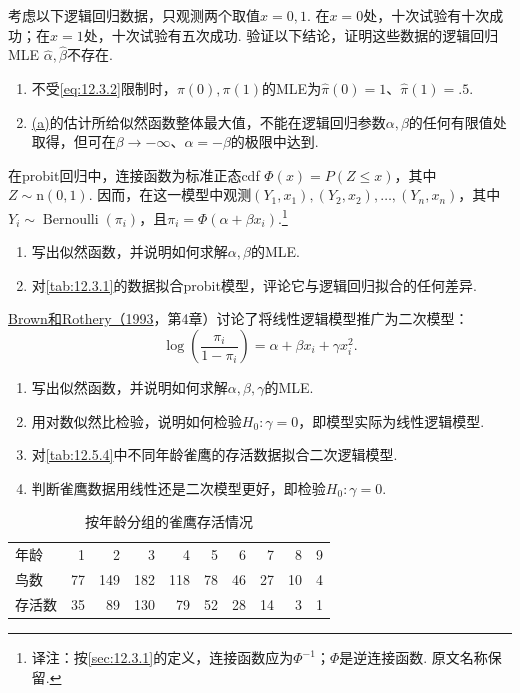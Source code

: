 \begin{exercise}\label{exercise:12.16}
考虑以下逻辑回归数据，只观测两个取值$x=0,1$. 在$x=0$处，十次试验有十次成功；在$x=1$处，十次试验有五次成功. 验证以下结论，证明这些数据的逻辑回归MLE $\hat\alpha,\hat\beta$不存在.
\begin{enumerate}[label=(\alph*)]
\item\label{item:12.16.a} 不受\eqref{eq:12.3.2}限制时，$\pi(0),\pi(1)$的MLE为$\hat\pi(0)=1$、$\hat\pi(1)=.5$.
\item\label{item:12.16.b} \hyperref[item:12.16.a]{(a)}的估计所给似然函数整体最大值，不能在逻辑回归参数$\alpha,\beta$的任何有限值处取得，但可在$\beta\to-\infty$、$\alpha=-\beta$的极限中达到.
\end{enumerate}
\end{exercise}
\begin{exercise}\label{exercise:12.17}
在probit回归中，连接函数为标准正态cdf $\Phi(x)=P(Z\le x)$，其中$Z\sim\mathrm n(0,1)$. 因而，在这一模型中观测$(Y_1,x_1),\allowbreak(Y_2,x_2),\allowbreak\ldots,\allowbreak(Y_n,x_n)$，其中$Y_i\sim\operatorname{Bernoulli}(\pi_i)$，且$\pi_i=\Phi(\alpha+\beta x_i)$.\footnote{译注：按\autoref{sec:12.3.1}的定义，连接函数应为$\Phi^{-1}$；$\Phi$是逆连接函数. 原文名称保留.}
\begin{enumerate}[label=(\alph*)]
\item\label{item:12.17.a} 写出似然函数，并说明如何求解$\alpha,\beta$的MLE.
\item\label{item:12.17.b} 对\autoref{tab:12.3.1}的数据拟合probit模型，评论它与逻辑回归拟合的任何差异.
\end{enumerate}
\end{exercise}

\begin{exercise}\label{exercise:12.18}
\hyperref[bib:source49]{Brown和Rothery（1993}，第4章）讨论了将线性逻辑模型推广为二次模型：
$$\log\left(\frac{\pi_i}{1-\pi_i}\right)=\alpha+\beta x_i+\gamma x_i^2.$$
\begin{enumerate}[label=(\alph*)]
\item\label{item:12.18.a} 写出似然函数，并说明如何求解$\alpha,\beta,\gamma$的MLE.
\item\label{item:12.18.b} 用对数似然比检验，说明如何检验$H_0:\gamma=0$，即模型实际为线性逻辑模型.
\item\label{item:12.18.c} 对\autoref{tab:12.5.4}中不同年龄雀鹰的存活数据拟合二次逻辑模型.
\item\label{item:12.18.d} 判断雀鹰数据用线性还是二次模型更好，即检验$H_0:\gamma=0$.
\end{enumerate}
\begin{table}[htbp]\centering\setcounter{table}{3}
\caption{按年龄分组的雀鹰存活情况}\label{tab:12.5.4}
\begin{tabular}{lrrrrrrrrr}\toprule
年龄&1&2&3&4&5&6&7&8&9\\
鸟数&77&149&182&118&78&46&27&10&4\\
存活数&35&89&130&79&52&28&14&3&1\\\bottomrule
\end{tabular}
\end{table}
\end{exercise}


